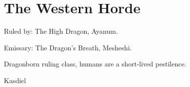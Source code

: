 \section{The Western Horde}

Ruled by: The High Dragon, Ayanum.

Emissary: The Dragon's Breath, Mesheshi.

Dragonborn ruling class, humans are a short-lived pestilence.


Kasdiel
